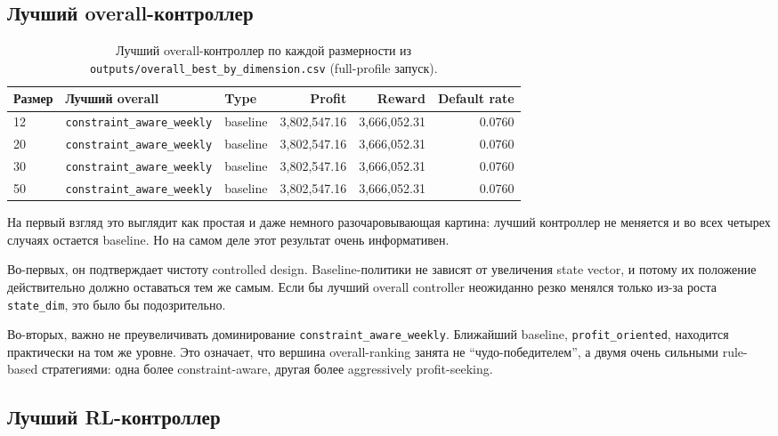 \documentclass[12pt,a4paper]{article}
\begin{document}
\subsection{Лучший overall-контроллер}

\begin{table}[H]
    \centering
    \small
    \begin{tabular}{l l l r r r}
        \toprule
        Размер & Лучший overall & Type & Profit & Reward & Default rate \\
        \midrule
        12 & \texttt{constraint\_aware\_weekly} & baseline & 3{,}802{,}547.16 & 3{,}666{,}052.31 & 0.0760 \\
        20 & \texttt{constraint\_aware\_weekly} & baseline & 3{,}802{,}547.16 & 3{,}666{,}052.31 & 0.0760 \\
        30 & \texttt{constraint\_aware\_weekly} & baseline & 3{,}802{,}547.16 & 3{,}666{,}052.31 & 0.0760 \\
        50 & \texttt{constraint\_aware\_weekly} & baseline & 3{,}802{,}547.16 & 3{,}666{,}052.31 & 0.0760 \\
        \bottomrule
    \end{tabular}
    \caption{Лучший overall-контроллер по каждой размерности из \texttt{outputs/overall\_best\_by\_dimension.csv} (full-profile запуск).}
    \label{tab:ru-best-overall}
\end{table}

На первый взгляд это выглядит как простая и даже немного разочаровывающая картина: лучший контроллер не меняется и во всех четырех случаях остается baseline. Но на самом деле этот результат очень информативен.

Во-первых, он подтверждает чистоту controlled design. Baseline-политики не зависят от увеличения state vector, и потому их положение действительно должно оставаться тем же самым. Если бы лучший overall controller неожиданно резко менялся только из-за роста \texttt{state\_dim}, это было бы подозрительно.

Во-вторых, важно не преувеличивать доминирование \texttt{constraint\_aware\_weekly}. Ближайший baseline, \texttt{profit\_oriented}, находится практически на том же уровне. Это означает, что вершина overall-ranking занята не ``чудо-победителем'', а двумя очень сильными rule-based стратегиями: одна более constraint-aware, другая более aggressively profit-seeking.

\subsection{Лучший RL-контроллер}
\end{document}
